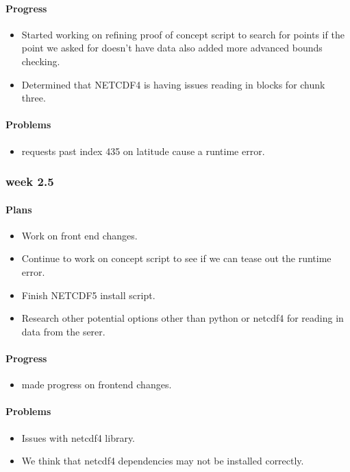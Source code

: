 \documentclass[onecolumn, draftclsnofoot,10pt, compsoc]{article}
\begin{document}
					\paragraph{Progress}
						\begin{itemize}
							\item Started working on refining proof of concept script to search for points if the point we asked for doesn't have data also added more advanced bounds checking.
							\item Determined that NETCDF4 is having issues reading in blocks for chunk three.
						\end{itemize}
					\paragraph{Problems}
						\begin{itemize}
							\item requests past index 435 on latitude cause a runtime error.
						\end{itemize}

				\subsubsection{week 2.5}
					\paragraph{Plans}
						\begin{itemize}
							\item Work on front end changes.
							\item Continue to work on concept script to see if we can tease out the runtime error.
							\item Finish NETCDF5 install script.
							\item Research other potential options other than python or netcdf4 for reading in data from the serer.\\

						\end{itemize}
					\paragraph{Progress}
						\begin{itemize}
							\item made progress on frontend changes.
						\end{itemize}

					\paragraph{Problems}
						\begin{itemize}
							\item Issues with netcdf4 library.
							\item We think that netcdf4 dependencies may not be installed correctly.
						\end{itemize}
\end{document}
